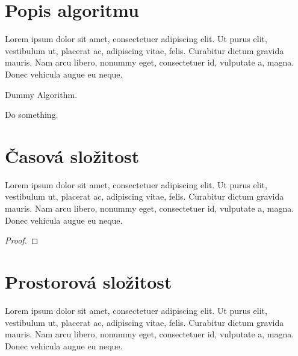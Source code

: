     \section{Popis algoritmu}
        Lorem ipsum dolor sit amet, consectetuer adipiscing elit. Ut purus elit, vestibulum ut, placerat ac, adipiscing vitae, felis. Curabitur dictum gravida mauris. Nam arcu libero, nonummy eget, consectetuer id, vulputate a, magna. Donec vehicula augue eu neque.

        \begin{algorithm}[h]
            \SetAlgoLined
            \caption{Dummy Algorithm.}
            Do something.\;
        \end{algorithm}

        \lipsum[1-2]

    \section{Časová složitost}
        \begin{theorem}
            Lorem ipsum dolor sit amet, consectetuer adipiscing elit. Ut purus elit, vestibulum ut, placerat ac, adipiscing vitae, felis. Curabitur dictum gravida mauris. Nam arcu libero, nonummy eget, consectetuer id, vulputate a, magna. Donec vehicula augue eu neque.
        \end{theorem}

        \begin{proof}
            \lipsum[1]
        \end{proof}

    \section{Prostorová složitost}
        \begin{theorem}
            Lorem ipsum dolor sit amet, consectetuer adipiscing elit. Ut purus elit, vestibulum ut, placerat ac, adipiscing vitae, felis. Curabitur dictum gravida mauris. Nam arcu libero, nonummy eget, consectetuer id, vulputate a, magna. Donec vehicula augue eu neque.
        \end{theorem}

